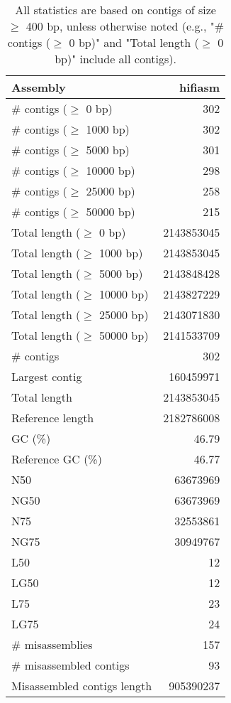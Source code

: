 \documentclass[12pt,a4paper]{article}
\begin{document}
\begin{table}[ht]
\begin{center}
\caption{All statistics are based on contigs of size $\geq$ 400 bp, unless otherwise noted (e.g., "\# contigs ($\geq$ 0 bp)" and "Total length ($\geq$ 0 bp)" include all contigs).}
\begin{tabular}{|l*{1}{|r}|}
\hline
Assembly & hifiasm \\ \hline
\# contigs ($\geq$ 0 bp) & 302 \\ \hline
\# contigs ($\geq$ 1000 bp) & 302 \\ \hline
\# contigs ($\geq$ 5000 bp) & 301 \\ \hline
\# contigs ($\geq$ 10000 bp) & 298 \\ \hline
\# contigs ($\geq$ 25000 bp) & 258 \\ \hline
\# contigs ($\geq$ 50000 bp) & 215 \\ \hline
Total length ($\geq$ 0 bp) & 2143853045 \\ \hline
Total length ($\geq$ 1000 bp) & 2143853045 \\ \hline
Total length ($\geq$ 5000 bp) & 2143848428 \\ \hline
Total length ($\geq$ 10000 bp) & 2143827229 \\ \hline
Total length ($\geq$ 25000 bp) & 2143071830 \\ \hline
Total length ($\geq$ 50000 bp) & 2141533709 \\ \hline
\# contigs & 302 \\ \hline
Largest contig & 160459971 \\ \hline
Total length & 2143853045 \\ \hline
Reference length & 2182786008 \\ \hline
GC (\%) & 46.79 \\ \hline
Reference GC (\%) & 46.77 \\ \hline
N50 & 63673969 \\ \hline
NG50 & 63673969 \\ \hline
N75 & 32553861 \\ \hline
NG75 & 30949767 \\ \hline
L50 & 12 \\ \hline
LG50 & 12 \\ \hline
L75 & 23 \\ \hline
LG75 & 24 \\ \hline
\# misassemblies & 157 \\ \hline
\# misassembled contigs & 93 \\ \hline
Misassembled contigs length & 905390237 \\ \hline

\end{tabular}
\end{center}
\end{table}
\end{document}

